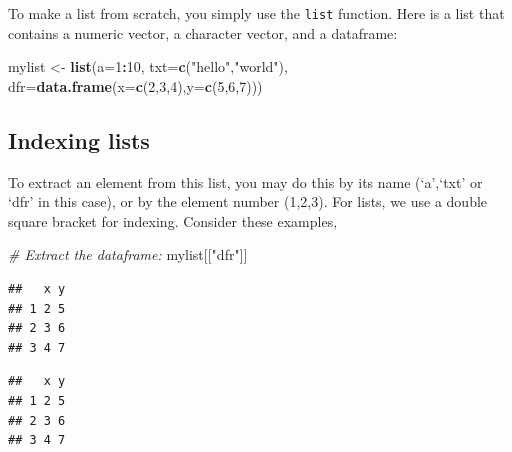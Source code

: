 \documentclass[]{book}
\newenvironment{Shaded}{\begin{snugshade}}{\end{snugshade}}
\newcommand{\CommentTok}[1]{\textcolor[rgb]{0.56,0.35,0.01}{\textit{#1}}}
\newcommand{\DataTypeTok}[1]{\textcolor[rgb]{0.13,0.29,0.53}{#1}}
\newcommand{\DecValTok}[1]{\textcolor[rgb]{0.00,0.00,0.81}{#1}}
\newcommand{\KeywordTok}[1]{\textcolor[rgb]{0.13,0.29,0.53}{\textbf{#1}}}
\newcommand{\NormalTok}[1]{#1}
\newcommand{\OperatorTok}[1]{\textcolor[rgb]{0.81,0.36,0.00}{\textbf{#1}}}
\newcommand{\StringTok}[1]{\textcolor[rgb]{0.31,0.60,0.02}{#1}}
\begin{document}
To make a list from scratch, you simply use the \texttt{list} function. Here is a list that contains a numeric vector, a character vector, and a dataframe:

\begin{Shaded}
\begin{Highlighting}[]
\NormalTok{mylist <-}\StringTok{ }\KeywordTok{list}\NormalTok{(}\DataTypeTok{a=}\DecValTok{1}\OperatorTok{:}\DecValTok{10}\NormalTok{, }\DataTypeTok{txt=}\KeywordTok{c}\NormalTok{(}\StringTok{"hello"}\NormalTok{,}\StringTok{"world"}\NormalTok{), }\DataTypeTok{dfr=}\KeywordTok{data.frame}\NormalTok{(}\DataTypeTok{x=}\KeywordTok{c}\NormalTok{(}\DecValTok{2}\NormalTok{,}\DecValTok{3}\NormalTok{,}\DecValTok{4}\NormalTok{),}\DataTypeTok{y=}\KeywordTok{c}\NormalTok{(}\DecValTok{5}\NormalTok{,}\DecValTok{6}\NormalTok{,}\DecValTok{7}\NormalTok{)))}
\end{Highlighting}
\end{Shaded}

\hypertarget{indexing-lists}{%
\subsection{Indexing lists}\label{indexing-lists}}

To extract an element from this list, you may do this by its name (`a',`txt' or `dfr' in this case), or by the element number (1,2,3). For lists, we use a double square bracket for indexing. Consider these examples,

\begin{Shaded}
\begin{Highlighting}[]
\CommentTok{# Extract the dataframe:}
\NormalTok{mylist[[}\StringTok{"dfr"}\NormalTok{]]}
\end{Highlighting}
\end{Shaded}

\begin{verbatim}
##   x y
## 1 2 5
## 2 3 6
## 3 4 7
\end{verbatim}

\begin{Shaded}
\end{Shaded}

\begin{verbatim}
##   x y
## 1 2 5
## 2 3 6
## 3 4 7
\end{verbatim}
\end{document}

